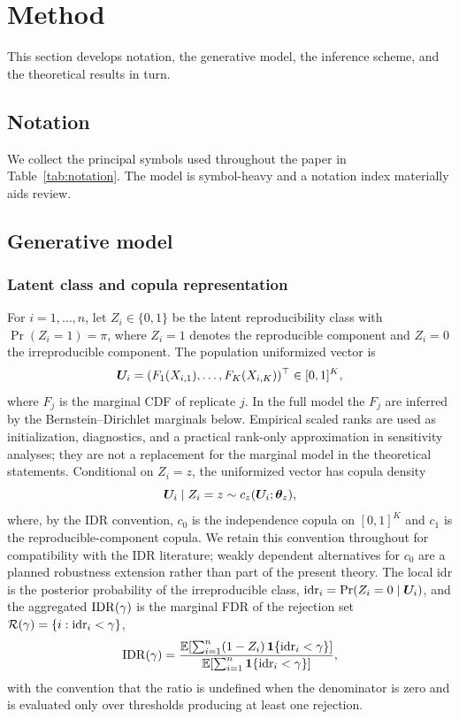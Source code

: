 \section{Method}
\label{sec:method}

This section develops notation, the generative model, the inference scheme, and the theoretical results in turn.

\subsection{Notation}
\label{sec:notation}

We collect the principal symbols used throughout the paper in Table~\ref{tab:notation}. The model is symbol-heavy and a notation index materially aids review.



\subsection{Generative model}
\label{sec:model}

\subsubsection{Latent class and copula representation}

For $i = 1, \ldots, n$, let $Z_i \in \{0, 1\}$ be the latent reproducibility class with $\Pr(Z_i = 1) = \pi$, where $Z_i = 1$ denotes the reproducible component and $Z_i = 0$ the irreproducible component. The population uniformized vector is
\[
\bm{U}_i = (F_1(X_{i,1}), \ldots, F_K(X_{i,K}))^\top \in [0,1]^K,
\]
where $F_j$ is the marginal CDF of replicate $j$. In the full model the $F_j$ are inferred by the Bernstein--Dirichlet marginals below. Empirical scaled ranks are used as initialization, diagnostics, and a practical rank-only approximation in sensitivity analyses; they are not a replacement for the marginal model in the theoretical statements. Conditional on $Z_i = z$, the uniformized vector has copula density
\begin{equation}
\bm{U}_i \mid Z_i = z \sim c_z(\bm{U}_i; \bm{\theta}_z),
\label{eq:cop-density}
\end{equation}
where, by the IDR convention, $c_0$ is the independence copula on $[0,1]^K$ and $c_1$ is the reproducible-component copula. We retain this convention throughout for compatibility with the IDR literature; weakly dependent alternatives for $c_0$ are a planned robustness extension rather than part of the present theory. The local idr is the posterior probability of the irreproducible class, $\mathrm{idr}_i = \Pr(Z_i = 0 \mid \bm{U}_i)$, and the aggregated $\mathrm{IDR}(\gamma)$ is the marginal FDR of the rejection set $\mathcal{R}(\gamma) = \{i : \mathrm{idr}_i < \gamma\}$,
\begin{equation}
\mathrm{IDR}(\gamma) = \frac{\mathbb{E}\!\left[\sum_{i=1}^n (1-Z_i)\,\bm{1}\{\mathrm{idr}_i < \gamma\}\right]}{\mathbb{E}\!\left[\sum_{i=1}^n \bm{1}\{\mathrm{idr}_i < \gamma\}\right]},
\label{eq:agg-idr}
\end{equation}
with the convention that the ratio is undefined when the denominator is zero and is evaluated only over thresholds producing at least one rejection.

